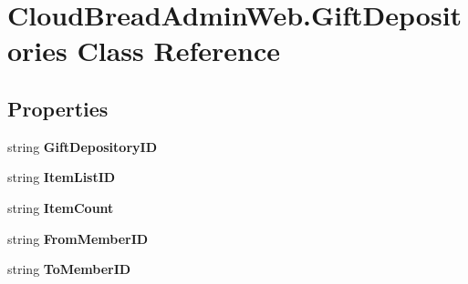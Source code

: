 \hypertarget{class_cloud_bread_admin_web_1_1_gift_depositories}{}\section{Cloud\+Bread\+Admin\+Web.\+Gift\+Depositories Class Reference}
\label{class_cloud_bread_admin_web_1_1_gift_depositories}
\subsection*{Properties}
\begin{DoxyCompactItemize}
\item 
string {\bfseries Gift\+Depository\+ID}\hypertarget{class_cloud_bread_admin_web_1_1_gift_depositories_a76c49c1714a8fa79c994317493ce4af4}{}\label{class_cloud_bread_admin_web_1_1_gift_depositories_a76c49c1714a8fa79c994317493ce4af4}

\item 
string {\bfseries Item\+List\+ID}\hypertarget{class_cloud_bread_admin_web_1_1_gift_depositories_ad177025b7cad26e9b84015cf6d018c2a}{}\label{class_cloud_bread_admin_web_1_1_gift_depositories_ad177025b7cad26e9b84015cf6d018c2a}

\item 
string {\bfseries Item\+Count}\hypertarget{class_cloud_bread_admin_web_1_1_gift_depositories_abcff89f2ed73f8c00524eb7552e44442}{}\label{class_cloud_bread_admin_web_1_1_gift_depositories_abcff89f2ed73f8c00524eb7552e44442}

\item 
string {\bfseries From\+Member\+ID}\hypertarget{class_cloud_bread_admin_web_1_1_gift_depositories_af174cb0460016548f85d09f8ec3fa405}{}\label{class_cloud_bread_admin_web_1_1_gift_depositories_af174cb0460016548f85d09f8ec3fa405}

\item 
string {\bfseries To\+Member\+ID}\hypertarget{class_cloud_bread_admin_web_1_1_gift_depositories_a40041d2de30d27046218b671de82defc}{}\label{class_cloud_bread_admin_web_1_1_gift_depositories_a40041d2de30d27046218b671de82defc}


\end{DoxyCompactItemize}
